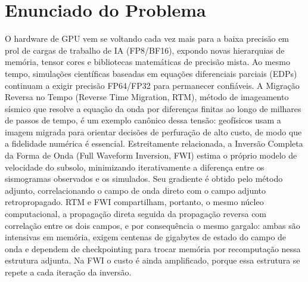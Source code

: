 \documentclass[12pt,a4paper]{article}
\begin{document}
\newpage

\section{Enunciado do Problema}

O hardware de GPU vem se voltando cada vez mais para a baixa precisão em prol
de cargas de trabalho de IA (FP8/BF16), expondo novas hierarquias de memória,
tensor cores e bibliotecas matemáticas de precisão mista. Ao mesmo tempo,
simulações científicas baseadas em equações diferenciais parciais (EDPs)
continuam a exigir precisão FP64/FP32 para permanecer confiáveis. A Migração
Reversa no Tempo (Reverse Time Migration, RTM), método de imageamento sísmico
que resolve a equação da onda por diferenças finitas ao longo de milhares de
passos de tempo, é um exemplo canônico dessa tensão: geofísicos usam a imagem
migrada para orientar decisões de perfuração de alto custo, de modo que a
fidelidade numérica é essencial. Estreitamente relacionada, a Inversão
Completa da Forma de Onda (Full Waveform Inversion, FWI) estima o próprio
modelo de velocidade do subsolo, minimizando iterativamente a diferença
entre os sismogramas observados e os simulados. Seu gradiente é obtido pelo
método adjunto, correlacionando o campo de onda direto com o campo adjunto
retropropagado. RTM e FWI compartilham, portanto, o mesmo núcleo
computacional, a propagação direta seguida da propagação reversa com
correlação entre os dois campos, e por consequência o mesmo gargalo: ambas
são intensivas em memória, exigem centenas de gigabytes de estado do campo
de onda e dependem de checkpointing para trocar memória por recomputação
nessa estrutura adjunta. Na FWI o custo é ainda amplificado, porque essa
estrutura se repete a cada iteração da inversão.
\end{document}
